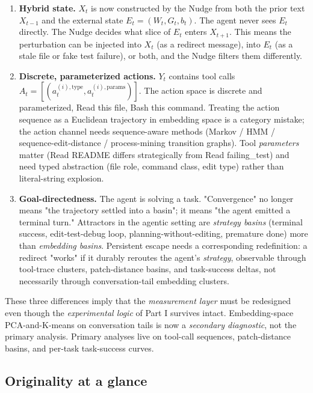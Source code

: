 \documentclass{article}
\theoremstyle{plain}
\theoremstyle{definition}
\begin{document}
\begin{enumerate}
  \item \textbf{Hybrid state.} $X_t$ is now constructed by the Nudge from both the prior text $X_{t-1}$ and the external state $E_t = (W_t, G_t, b_t)$. The agent never sees $E_t$ directly. The Nudge decides what slice of $E_t$ enters $X_{t+1}$. This means the perturbation can be injected into $X_t$ (as a redirect message), into $E_t$ (as a stale file or fake test failure), or both, and the Nudge filters them differently.
  \item \textbf{Discrete, parameterized actions.} $Y_t$ contains tool calls $A_t = [(a_t^{(i),\text{type}}, a_t^{(i),\text{params}})]$. The action space is discrete and parameterized, Read this file, Bash this command. Treating the action sequence as a Euclidean trajectory in embedding space is a category mistake; the action channel needs sequence-aware methods (Markov / HMM / sequence-edit-distance / process-mining transition graphs). Tool \textit{parameters} matter (Read README differs strategically from Read failing\_test) and need typed abstraction (file role, command class, edit type) rather than literal-string explosion.
  \item \textbf{Goal-directedness.} The agent is solving a task. "Convergence" no longer means "the trajectory settled into a basin"; it means "the agent emitted a terminal turn." Attractors in the agentic setting are \textit{strategy basins} (terminal success, edit-test-debug loop, planning-without-editing, premature done) more than \textit{embedding basins}. Persistent escape needs a corresponding redefinition: a redirect "works" if it durably reroutes the agent's \textit{strategy}, observable through tool-trace clusters, patch-distance basins, and task-success deltas, not necessarily through conversation-tail embedding clusters.
\end{enumerate}

These three differences imply that the \textit{measurement layer} must be redesigned even though the \textit{experimental logic} of Part I survives intact. Embedding-space PCA-and-K-means on conversation tails is now a \textit{secondary diagnostic}, not the primary analysis. Primary analyses live on tool-call sequences, patch-distance basins, and per-task task-success curves.

\subsection{Originality at a glance}
\end{document}
